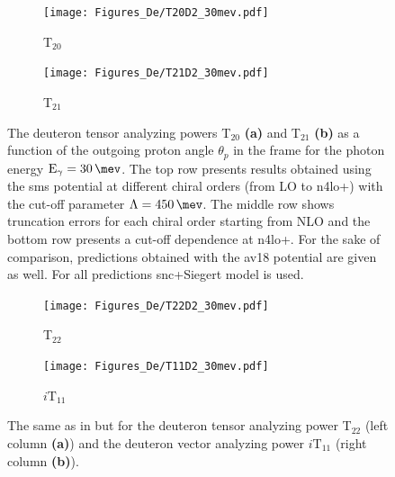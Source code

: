     \begin{figure}[htb]
        \centering
        \begin{subfigure}[b]{0.46\textwidth}
            \caption{T$_{20}$}
            \texttt{[image: Figures\_De/T20D2\_30mev.pdf]}
            \label{T20_30_vert}
        \end{subfigure}
        \begin{subfigure}[b]{0.46\textwidth}
            \caption{T$_{21}$}
            \texttt{[image: Figures\_De/T21D2\_30mev.pdf]}
            \label{T21_30_vert}
        \end{subfigure}
        \caption{The deuteron tensor analyzing powers T$_{20}$  {\bf (a)}
        and T$_{21}$ {\bf (b)}
        as a function of the outgoing proton angle $\theta_p$ in the  frame 
        for the photon energy $\text{E}_\gamma = \SI{30}{\mev}$.
        The top row presents results obtained using the \gls{sms} potential
        at different chiral orders (from LO to \gls{n4lo+}) with the cut-off parameter $\Lambda=\SI{450}{\mev}$.
        The middle row shows truncation errors for each 
        chiral order starting from NLO and
        the bottom row presents a cut-off dependence at \gls{n4lo+}.
        For the sake of comparison, predictions obtained with the \gls{av18} potential are given as well.
        For all predictions \gls{snc}+Siegert model is used.}
        \label{T20_T21_30}
    \end{figure}

    \begin{figure}[htb]
        \centering
        \begin{subfigure}[b]{0.46\textwidth}
            \caption{T$_{22}$}
            \texttt{[image: Figures\_De/T22D2\_30mev.pdf]}
            \label{T22_30_vert}
        \end{subfigure}
        \begin{subfigure}[b]{0.46\textwidth}
            \caption{$i\text{T}_{11}$}
            \texttt{[image: Figures\_De/T11D2\_30mev.pdf]}
            \label{T11_30_vert}
        \end{subfigure}
        \caption{The same as in  but for the deuteron tensor analyzing power
        T$_{22}$ (left column {\bf (a)}) and the deuteron vector analyzing power
        $i\text{T}_{11}$ (right column  {\bf (b)}).}
        \label{T22_T11_30}
    \end{figure}

